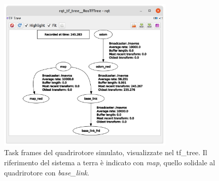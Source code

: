 \begin{figure}[H]
	\centering
	\includegraphics[width=0.75\textwidth]{gfx/ROS/rqt_tf_tree}
	\caption[Task frames del quadrirotore simulato, nel tf\_tree.]{Task frames del quadrirotore simulato, visualizzate nel tf\_tree. Il riferimento del sistema a terra è indicato con \emph{map}, quello solidale al quadrirotore con \emph{base\_link}.}
	\label{fig:tf_tree}
\end{figure}
